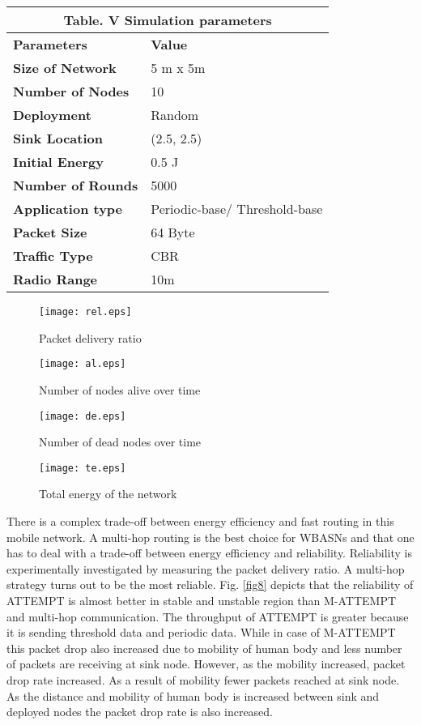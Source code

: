 \documentclass[journal]{IEEEtran}
\begin{document}
\begin{table}[!ht]
\begin{center}
\begin{tabular}{| p{3cm} || p{3cm} |}
  \multicolumn{2}{c}{Table. V Simulation parameters}\\
  \hline
  \textbf{Parameters}         &  \textbf{Value}   \\ \hline \hline
   \textbf{Size of Network	} &  5 m x 5m	 \\ \hline
    \textbf{Number of Nodes}  &  10	         \\ \hline
     \textbf{Deployment}      &  Random      \\ \hline
      \textbf{Sink Location}  &  (2.5, 2.5)	 \\ \hline
   \textbf{Initial Energy}	  &  0.5 J	     \\ \hline
   \textbf{Number of Rounds}  &  5000	     \\ \hline
   \textbf{Application type}  &  Periodic-base/ Threshold-base	 \\ \hline
     \textbf{Packet Size}     &   64 Byte	 \\ \hline
     \textbf{Traffic Type}    &  CBR         \\ \hline
     \textbf{Radio Range}     &   10m	 \\ \hline
\end{tabular}
\end{center}
\end{table}




\begin{figure}[ht]
\begin{center}
\texttt{[image: rel.eps]}
\caption{Packet delivery ratio}\label{fig8}
\texttt{[image: al.eps]}
\caption{Number of nodes alive over time }\label{fig9}
\texttt{[image: de.eps]}
\caption{Number of dead nodes over time }\label{fig10}
\texttt{[image: te.eps]}
\caption{Total energy of the network}\label{fig11}
\end{center}
\end{figure}

There is a complex trade-off between energy efficiency and fast routing in this mobile network. A multi-hop routing is the best choice for WBASNs and that one has to deal with a trade-off between energy efficiency and reliability. Reliability is experimentally investigated by measuring the packet delivery ratio. A multi-hop strategy turns out to be the most reliable. Fig. \ref{fig8} depicts that the reliability of ATTEMPT is almost  better in stable and unstable region than M-ATTEMPT and multi-hop communication. The throughput of ATTEMPT is greater because it is sending threshold data and periodic data. While in case of M-ATTEMPT this packet drop also increased due to mobility of human body and less number of packets are receiving at sink node. However, as the mobility increased, packet drop rate increased. As a result of mobility fewer packets reached at sink node. As the distance and mobility of human body is increased between sink and deployed nodes the packet drop rate is also increased.
\end{document}

